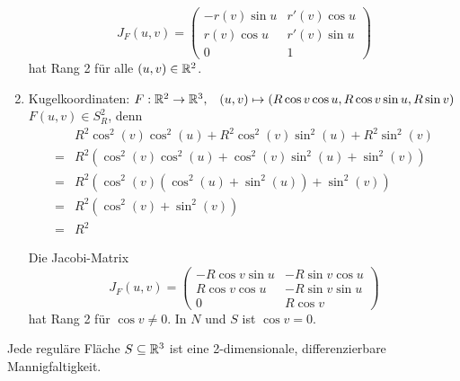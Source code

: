 \begin{beispiel}
\begin{enumerate}[label=\arabic*)]
            \[J_F(u,v) = 
            \begin{pmatrix}
                -r(v) \sin u & r'(v) \cos u\\
                r(v) \cos u  & r'(v) \sin u\\
                 0           & 1
            \end{pmatrix}\]
            hat Rang 2 für alle $(u,v) \in \mathbb{R}^2$.
        \item Kugelkoordinaten: $F: \mathbb{R}^2 \rightarrow \mathbb{R}^3, \;\;\; (u, v) \mapsto (R \cos v \cos u, R \cos v \sin u, R \sin v)$
              $F(u,v) \in S_R^2$, denn 
                \begin{align*}
                    & R^2 \cos^2(v) \cos^2(u) + R^2 \cos^2(v) \sin^2(u) + R^2 \sin^2(v)\\
                    =& R^2 (\cos^2(v) \cos^2(u) + \cos^2(v) \sin^2(u) + \sin^2(v))\\
                    =& R^2 \left (\cos^2(v) (\cos^2(u) + \sin^2(u)) + \sin^2(v) \right)\\
                    =& R^2 \left (\cos^2(v) + \sin^2(v) \right)\\
                    =&R^2
                \end{align*}

                Die Jacobi-Matrix
                \[J_F(u,v) = 
                \begin{pmatrix}
                    -R \cos v \sin u & -R \sin v \cos u\\
                    R \cos v \cos u  & -R \sin v \sin u\\
                    0                & R \cos v
                \end{pmatrix}\]
                hat Rang 2 für $\cos v \neq 0$. In $N$ und $S$ ist
                $\cos v = 0$.
    \end{enumerate}
\end{beispiel}

\begin{korollar}
    Jede reguläre Fläche $S \subseteq \mathbb{R}^3$ ist eine 2-dimensionale,
    differenzierbare Mannigfaltigkeit.
\end{korollar}

